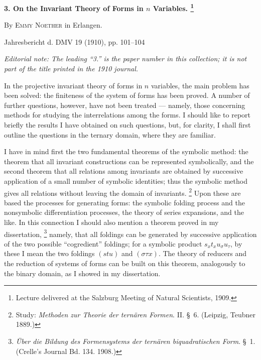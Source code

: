 \documentclass[11pt]{article}
\newcommand{\NoetherSrcNote}[2]{%
  \begingroup
  \renewcommand{\thefootnote}{[#1]}%
  \footnote{#2}%
  \endgroup
}
\begin{document}
\begin{center}
{\Large\bfseries 3. On the Invariant Theory of Forms in $n$ Variables.\NoetherSrcNote{101:1}{Lecture delivered at the Salzburg Meeting of Natural Scientists, 1909.}}\par
\vspace{1.2em}
By \textsc{Emmy Noether} in Erlangen.\par
\medskip
Jahresbericht d. DMV 19 (1910), pp. 101--104
\par\smallskip
{\small\itshape Editorial note: The leading ``3.'' is the paper number in this collection; it is not part of the title printed in the 1910 journal.}\par
\end{center}

\vspace{1em}

In the projective invariant theory of forms in $n$ variables, the main problem has been solved: the finiteness of the system of forms has been proved. A number of further questions, however, have not been treated --- namely, those concerning methods for studying the interrelations among the forms. I should like to report briefly the results I have obtained on such questions, but, for clarity, I shall first outline the questions in the ternary domain, where they are familiar.

I have in mind first the two fundamental theorems of the symbolic method: the theorem that all invariant constructions can be represented symbolically, and the second theorem that all relations among invariants are obtained by successive application of a small number of symbolic identities; thus the symbolic method gives all relations without leaving the domain of invariants.\NoetherSrcNote{102:1}{Study: \emph{Methoden zur Theorie der ternären Formen}. II. \S\ 6. (Leipzig, Teubner 1889.)} Upon these are based the processes for generating forms: the symbolic folding process and the nonsymbolic differentiation processes, the theory of series expansions, and the like. In this connection I should also mention a theorem proved in my dissertation,\NoetherSrcNote{102:2}{\emph{Über die Bildung des Formensystems der ternären biquadratischen Form}. \S\ 1. (Crelle's Journal Bd. 134. 1908.)} namely, that all foldings can be generated by successive application of the two possible ``cogredient'' foldings; for a symbolic product $s_x t_x u_\sigma u_\tau$, by these I mean the two foldings $(stu)$ and $(\sigma\tau x)$. The theory of reducers and the reduction of systems of forms can be built on this theorem, analogously to the binary domain, as I showed in my dissertation.
\end{document}
